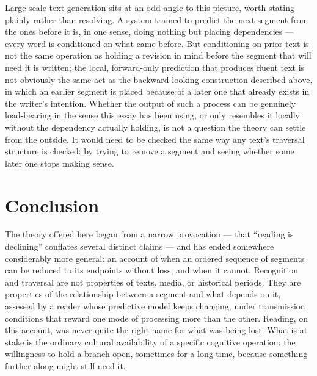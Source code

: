 \documentclass[11pt]{article}
\begin{document}
Large-scale text generation sits at an odd angle to this picture, worth stating plainly rather than resolving. A system trained to predict the next segment from the ones before it is, in one sense, doing nothing but placing dependencies --- every word is conditioned on what came before. But conditioning on prior text is not the same operation as holding a revision in mind before the segment that will need it is written; the local, forward-only prediction that produces fluent text is not obviously the same act as the backward-looking construction described above, in which an earlier segment is placed because of a later one that already exists in the writer's intention. Whether the output of such a process can be genuinely load-bearing in the sense this essay has been using, or only resembles it locally without the dependency actually holding, is not a question the theory can settle from the outside. It would need to be checked the same way any text's traversal structure is checked: by trying to remove a segment and seeing whether some later one stops making sense.

\section{Conclusion}

The theory offered here began from a narrow provocation --- that ``reading is declining'' conflates several distinct claims --- and has ended somewhere considerably more general: an account of when an ordered sequence of segments can be reduced to its endpoints without loss, and when it cannot. Recognition and traversal are not properties of texts, media, or historical periods. They are properties of the relationship between a segment and what depends on it, assessed by a reader whose predictive model keeps changing, under transmission conditions that reward one mode of processing more than the other. Reading, on this account, was never quite the right name for what was being lost. What is at stake is the ordinary cultural availability of a specific cognitive operation: the willingness to hold a branch open, sometimes for a long time, because something further along might still need it.
\end{document}
